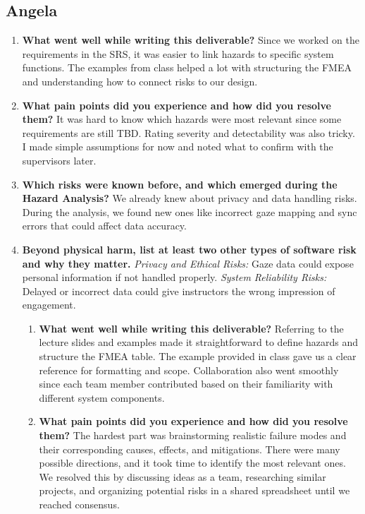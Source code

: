 \documentclass{article}
\begin{document}
\subsection*{Angela}
\begin{enumerate}
    \item \textbf{What went well while writing this deliverable?}  
    Since we worked on the requirements in the SRS, it was easier to link hazards to specific system functions. The examples from class helped a lot with structuring the FMEA and understanding how to connect risks to our design.

    \item \textbf{What pain points did you experience and how did you resolve them?}  
    It was hard to know which hazards were most relevant since some requirements are still TBD. Rating severity and detectability was also tricky. I made simple assumptions for now and noted what to confirm with the supervisors later.

    \item \textbf{Which risks were known before, and which emerged during the Hazard Analysis?}  
    We already knew about privacy and data handling risks. During the analysis, we found new ones like incorrect gaze mapping and sync errors that could affect data accuracy.

    \item \textbf{Beyond physical harm, list at least two other types of software risk and why they matter.}  
    \textit{Privacy and Ethical Risks:} Gaze data could expose personal information if not handled properly.
    \textit{System Reliability Risks:} Delayed or incorrect data could give instructors the wrong impression of engagement.

\begin{enumerate}
    \item \textbf{What went well while writing this deliverable?}  
    Referring to the lecture slides and examples made it straightforward to define hazards and structure the FMEA table. The example provided in class gave us a clear reference for formatting and scope. Collaboration also went smoothly since each team member contributed based on their familiarity with different system components.

    \item \textbf{What pain points did you experience and how did you resolve them?}  
    The hardest part was brainstorming realistic failure modes and their corresponding causes, effects, and mitigations. There were many possible directions, and it took time to identify the most relevant ones. We resolved this by discussing ideas as a team, researching similar projects, and organizing potential risks in a shared spreadsheet until we reached consensus.


\end{enumerate}
\end{enumerate}
\end{document}
